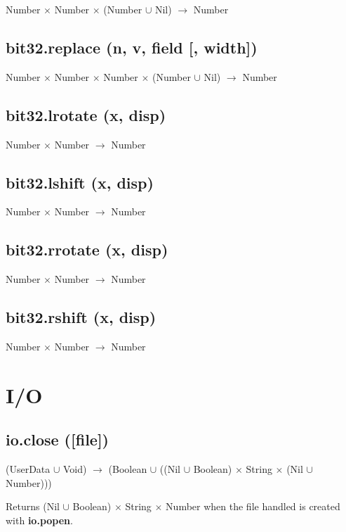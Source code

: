 \documentclass[12pt]{article}
\begin{document}
Number $\times$ Number $\times$
(Number $\cup$ Nil) $\rightarrow$
Number

\subsection{bit32.replace (n, v, field [, width])}

Number $\times$ Number $\times$ Number $\times$
(Number $\cup$ Nil) $\rightarrow$
Number

\subsection{bit32.lrotate (x, disp)}

Number $\times$ Number $\rightarrow$ Number

\subsection{bit32.lshift (x, disp)}

Number $\times$ Number $\rightarrow$ Number

\subsection{bit32.rrotate (x, disp)}

Number $\times$ Number $\rightarrow$ Number

\subsection{bit32.rshift (x, disp)}

Number $\times$ Number $\rightarrow$ Number

\newpage

\section{I/O}

\subsection{io.close ([file])}

(UserData $\cup$ Void) $\rightarrow$
(Boolean $\cup$ ((Nil $\cup$ Boolean) $\times$ String $\times$ (Nil $\cup$ Number)))

Returns (Nil $\cup$ Boolean) $\times$ String $\times$ Number when
the file handled is created with \textbf{io.popen}.
\end{document}
